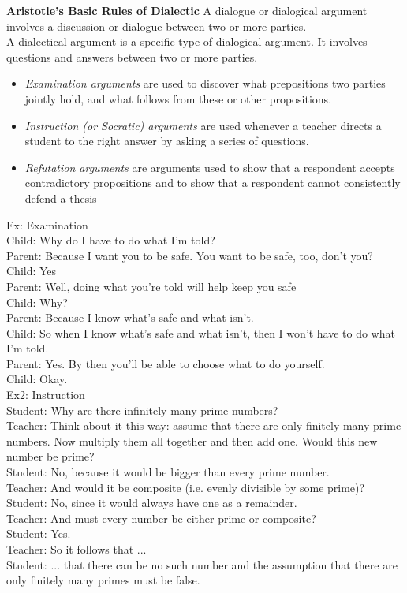 \textbf{Aristotle's Basic Rules of Dialectic}
A dialogue or dialogical argument involves a discussion or dialogue between two or more parties.\\
A dialectical argument is a specific type of dialogical argument. It involves questions and answers between two or more parties.
\begin{itemize}
    \item \textit{Examination arguments} are used to discover what prepositions two parties jointly hold, and what follows from these or other propositions.
    \item \textit{Instruction (or Socratic) arguments} are used whenever a teacher directs a student to the right answer by asking a series of questions.
    \item \textit{Refutation arguments} are arguments used to show that a respondent accepts contradictory propositions and to show that a respondent cannot consistently defend a thesis
\end{itemize}

Ex: Examination\\
Child: Why do I have to do what I'm told?\\
Parent: Because I want you to be safe. You want to be safe, too, don't you?\\
Child: Yes\\
Parent: Well, doing what you're told will help keep you safe\\
Child: Why?\\
Parent: Because I know what’s safe and what isn’t.\\
Child: So when I know what’s safe and what isn’t, then I won’t have to do what I’m told.\\
Parent: Yes. By then you’ll be able to choose what to do yourself.\\
Child: Okay.\\

Ex2: Instruction\\
Student: Why are there infinitely many prime numbers?\\
Teacher: Think about it this way: assume that there are only finitely many prime numbers. Now multiply them all together and then add one. Would this new number be prime?\\
Student: No, because it would be bigger than every prime number.\\
Teacher: And would it be composite (i.e. evenly divisible by some prime)?\\
Student: No, since it would always have one as a remainder.\\
Teacher: And must every number be either prime or composite?\\
Student: Yes.\\
Teacher: So it follows that ...\\
Student: ... that there can be no such number and the assumption that there are only finitely many primes must be false.\\

